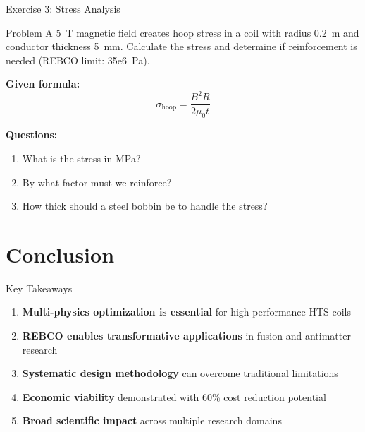 \documentclass[aspectratio=169,xcolor={table,dvipsnames}]{beamer}
\newcommand{\Tesla}[1]{#1~T}
\newcommand{\Pascal}[1]{#1~Pa}
\begin{document}
\begin{frame}{Exercise 3: Stress Analysis}
    \begin{block}{Problem}
        A \Tesla{5} magnetic field creates hoop stress in a coil with radius 0.2~m
        and conductor thickness 5~mm. Calculate the stress and determine
        if reinforcement is needed (REBCO limit: \Pascal{35e6}).
    \end{block}
    
    \vspace{0.3cm}
    \textbf{Given formula:}
    \begin{equation}
        \sigma_{\text{hoop}} = \frac{B^2 R}{2 \mu_0 t}
    \end{equation}
    
    \vspace{0.3cm}
    \textbf{Questions:}
    \begin{enumerate}
        \item What is the stress in MPa?
        \item By what factor must we reinforce?
        \item How thick should a steel bobbin be to handle the stress?
    \end{enumerate}
\end{frame}

\section{Conclusion}

\begin{frame}{Key Takeaways}
    \begin{enumerate}
        \item \textbf{Multi-physics optimization is essential} for high-performance HTS coils
        \item \textbf{REBCO enables transformative applications} in fusion and antimatter research
        \item \textbf{Systematic design methodology} can overcome traditional limitations
        \item \textbf{Economic viability} demonstrated with 60\% cost reduction potential
        \item \textbf{Broad scientific impact} across multiple research domains
    \end{enumerate}
    
    \vspace{0.5cm}
    \begin{center}
    \end{center}
\end{frame}
\end{document}
